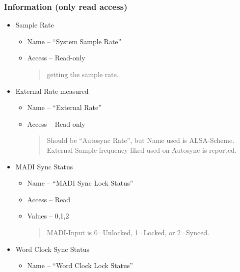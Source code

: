 \documentclass[a4paper,8pt,english]{sphinxmanual}
\begin{document}
\subsubsection{Information (only read access)}
\label{sound/cards/hdspm:information-only-read-access}\begin{itemize}
\item {} 
Sample Rate
\begin{itemize}
\item {} 
Name -- ``System Sample Rate''

\item {} 
Access -- Read-only
\begin{quote}

getting the sample rate.
\end{quote}

\end{itemize}

\item {} 
External Rate measured
\begin{itemize}
\item {} 
Name -- ``External Rate''

\item {} 
Access -- Read only
\begin{quote}

Should be ``Autosync Rate'', but Name used is
ALSA-Scheme. External Sample frequency liked used on Autosync is
reported.
\end{quote}

\end{itemize}

\item {} 
MADI Sync Status
\begin{itemize}
\item {} 
Name -- ``MADI Sync Lock Status''

\item {} 
Access -- Read

\item {} 
Values -- 0,1,2
\begin{quote}

MADI-Input is 0=Unlocked, 1=Locked, or 2=Synced.
\end{quote}

\end{itemize}

\item {} 
Word Clock Sync Status
\begin{itemize}
\item {} 
Name -- ``Word Clock Lock Status''


\end{itemize}
\end{itemize}
\end{document}
